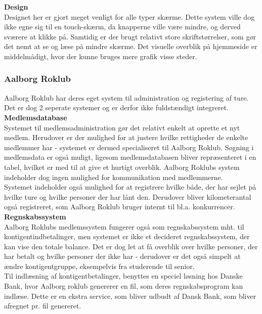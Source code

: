 {\bf Design}\\
Designet her er gjort meget venligt for alle typer skærme. Dette system ville dog ikke egne sig til en touch-skærm, da knapperne ville være mindre, og derved sværere at klikke på. Samtidig er der brugt relativt store skriftstørrelser, som gør det nemt at se og læse på mindre skærme. Det visuelle overblik på hjemmeside er middelmådigt, hvor der kunne bruges mere grafik visse steder.

\subsubsection{Aalborg Roklub}
\label{subsec:usability_ark}
Aalborg Roklub har deres eget system til administration og registering af ture. Det er dog 2 seperate systemer og er derfor ikke fuldstændigt integreret.\\

{\bf Medlemsdatabase}\\
Systemet til medlemsadministration gør det relativt enkelt at oprette et nyt medlem. Herudover er der mulighed for at justere hvilke rettigheder de enkelte medlemmer har - systemet er dermed specialiseret til Aalborg Roklub. Søgning i medlemsdata er også muligt, ligesom medlemsdatabasen bliver repræsenteret i en tabel, hvilket er med til at give et hurtigt overblik. Aalborg Roklubs system indeholder dog ingen mulighed for kommunikation med medlemmerne.\\

Systemet indeholder også mulighed for at registrere hvilke både, der har sejlet på hvilke ture og hvilke personer der har lånt den. Derudover bliver kilometerantal også registreret, som Aalborg Roklub bruger internt til bl.a. konkurrencer.\\

{\bf Regnskabssystem}\\
Aalborg Roklubs medlemssystem fungerer også som regnskabssystem mht. til kontigentindbetalinger, men systemet er ikke et decideret regnskabssystem, der kan vise den totale balance. Det er dog let at få overblik over hvilke personer, der har betalt og hvilke personer der ikke har - derudover er det også simpelt at ændre kontigentgruppe, eksempelvis fra studerende til senior.\\

Til indlæsning af kontigentbetalinger, benyttes en speciel løsning hos Danske Bank, hvor Aalborg roklub genererer en fil, som deres regnskabsprogram kan indlæse. Dette er en ekstra service, som bliver udbudt af Dansk Bank, som bliver afregnet pr. fil genereret.\\

